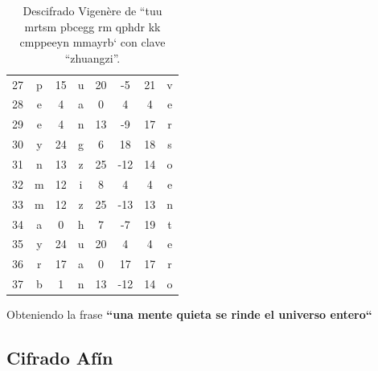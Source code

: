 \begin{itemize}
\begin{table}[H]
\begin{tabular}{|c|c|c|c|c|c|c|c|}
        27 & p & 15 & u & 20 & -5  & 21 & v \\
        28 & e & 4  & a & 0  & 4   & 4  & e \\
        29 & e & 4  & n & 13 & -9  & 17 & r \\
        30 & y & 24 & g & 6  & 18  & 18 & s \\
        31 & n & 13 & z & 25 & -12 & 14 & o \\
        32 & m & 12 & i & 8  & 4   & 4  & e \\
        33 & m & 12 & z & 25 & -13 & 13 & n \\
        34 & a & 0  & h & 7  & -7  & 19 & t \\
        35 & y & 24 & u & 20 & 4   & 4  & e \\
        36 & r & 17 & a & 0  & 17  & 17 & r \\
        37 & b & 1  & n & 13 & -12 & 14 & o \\
        \hline
        \end{tabular}
        \caption{Descifrado Vigen\`{e}re de ``tuu mrtsm pbcegg rm qphdr kk cmppeeyn mmayrb`
        con clave ``zhuangzi''.}
        \label{tab:vigenere_zhuangzi}
        \end{table}

        Obteniendo la frase \textbf{``una mente quieta se rinde el universo entero``}


\end{itemize}


\subsection{Cifrado Afín}

